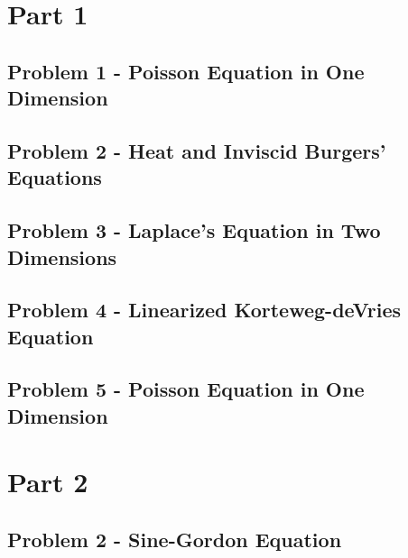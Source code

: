 \documentclass[a4paper, 12pt]{book}
\theoremstyle{break}
\theoremstyle{plain}
\begin{document}
\chapter{Part 1}

\section{Problem 1 - Poisson Equation in One Dimension}


\newpage

\section{Problem 2 - Heat and Inviscid Burgers' Equations}

\newpage

\section{Problem 3 - Laplace's Equation in Two Dimensions}

\newpage

\section{Problem 4 - Linearized Korteweg-deVries Equation}

\newpage

\section{Problem 5 - Poisson Equation in One Dimension}

\newpage


\chapter{Part 2}
\section{Problem 2 - Sine-Gordon Equation}
\label{"part 2"}



\appendix

\printbibliography
\end{document}

